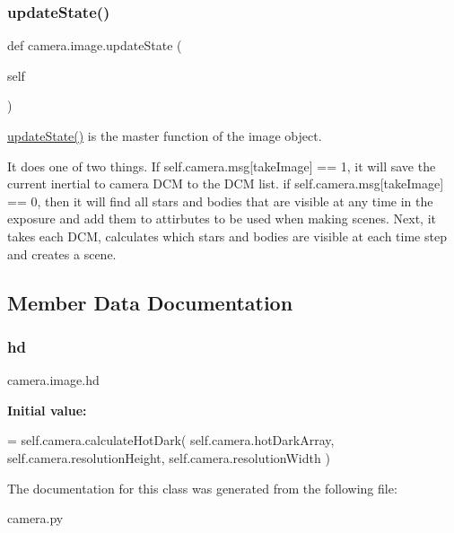 \subsubsection{\texorpdfstring{update\+State()}{updateState()}}
{\footnotesize\ttfamily def camera.\+image.\+update\+State (\begin{DoxyParamCaption}\item[{}]{self }\end{DoxyParamCaption})}



\hyperlink{classcamera_1_1image_ad5fcc766f1a0be37d8437f46d0fe720d}{update\+State()} is the master function of the image object. 

It does one of two things. If self.\+camera.\+msg\mbox{[}\textquotesingle{}take\+Image\textquotesingle{}\mbox{]} == 1, it will save the current inertial to camera D\+CM to the D\+CM list. if self.\+camera.\+msg\mbox{[}\textquotesingle{}take\+Image\textquotesingle{}\mbox{]} == 0, then it will find all stars and bodies that are visible at any time in the exposure and add them to attirbutes to be used when making scenes. Next, it takes each D\+CM, calculates which stars and bodies are visible at each time step and creates a scene. 

\subsection{Member Data Documentation}
\mbox{\label{classcamera_1_1image_a2a3c3af742462c4c873d652930ffd44d}} 
\subsubsection{\texorpdfstring{hd}{hd}}
{\footnotesize\ttfamily camera.\+image.\+hd\hspace{0.3cm}{\ttfamily [static]}}

{\bfseries Initial value\+:}
\begin{DoxyCode}
=  self.camera.calculateHotDark(
                                                    self.camera.hotDarkArray,
                                                    self.camera.resolutionHeight,
                                                    self.camera.resolutionWidth
                                                    )
\end{DoxyCode}


The documentation for this class was generated from the following file\+:\begin{DoxyCompactItemize}
\item 
camera.\+py\end{DoxyCompactItemize}
